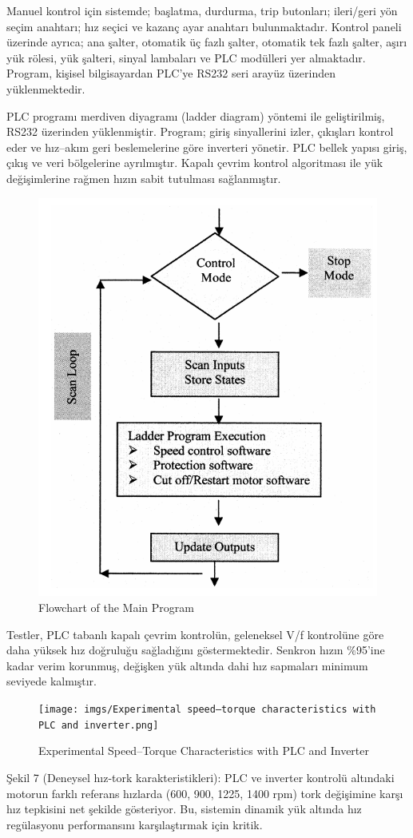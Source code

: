 Manuel kontrol için sistemde; başlatma, durdurma, trip butonları; ileri/geri yön seçim anahtarı; hız seçici ve kazanç ayar anahtarı bulunmaktadır. Kontrol paneli üzerinde ayrıca; ana şalter, otomatik üç fazlı şalter, otomatik tek fazlı şalter, aşırı yük rölesi, yük şalteri, sinyal lambaları ve PLC modülleri yer almaktadır. Program, kişisel bilgisayardan PLC’ye RS232 seri arayüz üzerinden yüklenmektedir.

PLC programı merdiven diyagramı (ladder diagram) yöntemi ile geliştirilmiş, RS232 üzerinden yüklenmiştir. Program; giriş sinyallerini izler, çıkışları kontrol eder ve hız–akım geri beslemelerine göre inverteri yönetir. PLC bellek yapısı giriş, çıkış ve veri bölgelerine ayrılmıştır. Kapalı çevrim kontrol algoritması ile yük değişimlerine rağmen hızın sabit tutulması sağlanmıştır.


\begin{figure}[H]
    \centering
    \includegraphics[width=0.4\columnwidth]{imgs/Flowchart of the main program..png}
    \caption[Short description for list of figures]{Flowchart of the Main Program}
    \label{fig-magnitude}
    \end{figure}%

Testler, PLC tabanlı kapalı çevrim kontrolün, geleneksel V/f kontrolüne göre daha yüksek hız doğruluğu sağladığını göstermektedir. Senkron hızın \%95’ine kadar verim korunmuş, değişken yük altında dahi hız sapmaları minimum seviyede kalmıştır. 

\begin{figure}[H]
    \centering
    \texttt{[image: imgs/Experimental speed–torque characteristics with PLC and inverter.png]}
    \caption[Short description for list of figures]{Experimental Speed–Torque Characteristics with PLC and Inverter}
    \label{fig-magnitude}
    \end{figure}%

Şekil 7 (Deneysel hız-tork karakteristikleri): PLC ve inverter kontrolü altındaki motorun farklı referans hızlarda (600, 900, 1225, 1400 rpm) tork değişimine karşı hız tepkisini net şekilde gösteriyor. Bu, sistemin dinamik yük altında hız regülasyonu performansını karşılaştırmak için kritik.


